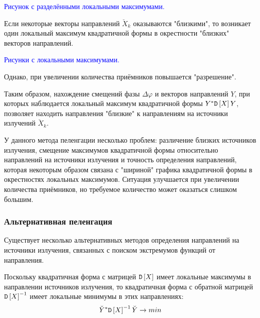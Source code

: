 
\textcolor{blue}{Рисунок с разделёнными локальными максимумами.}

Если некоторые векторы направлений $\breve{X}_k$ оказываются "близкими"{}, то возникает один локальный максимум квадратичной формы в окрестности "близких"{} векторов направлений.

\begin{Matlab}
\end{Matlab}
\textcolor{blue}{Рисунки с локальными максимумами.}

Однако,  при увеличении количества приёмников повышается "разрешение"{}.

Таким образом, нахождение смещений фазы $\Delta \varphi$ и векторов направлений $Y$, при которых наблюдается локальный максимум квадратичной формы
$Y^* \mathtt{D} \left [ X \right ] Y$, позволяет находить направления "близкие"{} к направлениям на источники излучений $\breve{X}_k$.

У данного метода пеленгации несколько проблем: различение близких источников излучения, смещение максимумов квадратичной формы относительно направлений на источники излучения
и точность определения направлений, которая некоторым образом связана с "шириной"{} графика квадратичной формы в окрестностях локальных максимумов. Ситуация улучшается при
увеличении количества приёмников, но требуемое количество может оказаться слишком большим.

\subsubsection{Альтернативная пеленгация}

Существует несколько альтернативных методов определения направлений на источники излучения, связанных с поиском экстремумов функций от направления.

Поскольку квадратичная форма с матрицей $\mathtt{D} \left [ X \right ]$ имеет локальные максимумы в направлении источников излучения, то квадратичная форма с обратной матрицей $\mathtt{D} \left [ X \right ]^{-1}$
имеет локальные минимумы в этих направлениях:
\[
    \breve{Y}^* \mathtt{D} \left [ X \right ]^{-1} \breve{Y} \rightarrow min
\]

